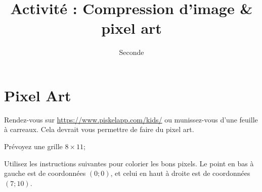 \documentclass{exos}
\title{Activité : Compression d'image \& pixel art}
\author{Seconde}
\date{}
\begin{document}
\maketitle

\section{Pixel Art}

\begin{tcolorbox}
Rendez-vous sur \url{https://www.piskelapp.com/kids/} ou munissez-vous d'une feuille à carreaux. Cela devrait vous permettre de faire du pixel art.
\end{tcolorbox}

\begin{alphaquestions}
\item Prévoyez une grille $8 \times 11$;
\item Utilisez les instructions suivantes pour colorier les bons pixels. Le point en bas à gauche est de coordonnées $(0;0)$, et celui en haut à droite est de coordonnées $(7;10)$.
\begin{itemize}


\end{itemize}
\end{alphaquestions}
\end{document}
